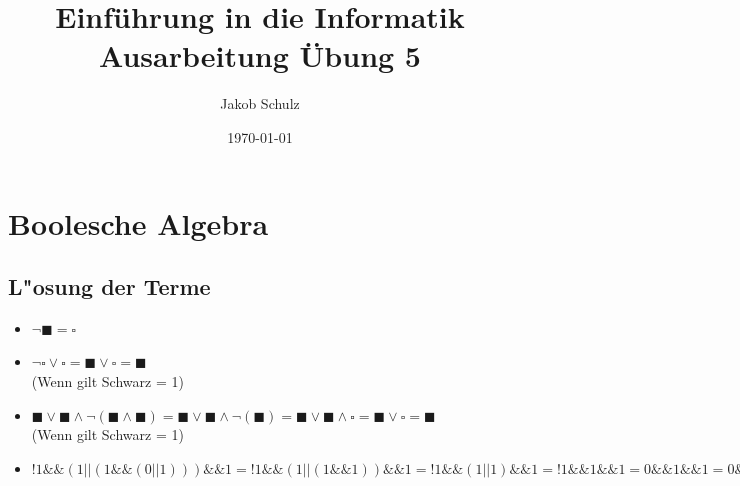 \documentclass[a4paper,11pt,titlepage]{article}
\begin{document}
\title{Einf\"uhrung in die Informatik\\
Ausarbeitung \"Ubung 5}


\author{Jakob Schulz}


\date{\today}

\maketitle{\thispagestyle{plain}}

\section{Boolesche Algebra}
\subsection{L"osung der Terme}
\begin{itemize}
\item $\neg\blacksquare = \square$
\item $\neg\square\vee\square = \blacksquare\vee\square = \blacksquare$\\
(Wenn gilt Schwarz = 1)
\item $\blacksquare\vee\blacksquare\wedge\neg(\blacksquare\wedge\blacksquare) = \blacksquare\vee\blacksquare\wedge\neg(\blacksquare) = 
\blacksquare\vee\blacksquare\wedge\square = \blacksquare\vee\square = \blacksquare$\\
(Wenn gilt Schwarz = 1)
\item $!1\&\&(1||(1\&\&(0||1)))\&\&1 = !1\&\&(1||(1\&\&1))\&\&1 = !1\&\&(1||1)\&\&1 = !1\&\&1\&\&1 = 0\&\&1\&\&1 =   0\&\&1 = 0$
\end{itemize}
\end{document}

